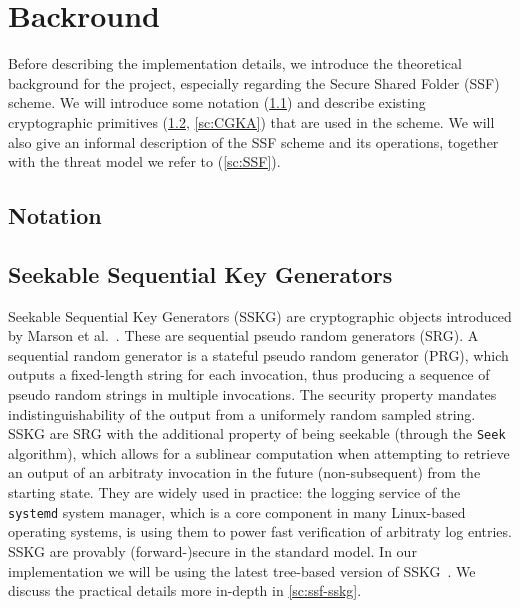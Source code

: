 \chapter{Backround}\label{ch:background}

Before describing the implementation details, we introduce the theoretical
background for the project, especially regarding the Secure Shared Folder 
(SSF) scheme. We will introduce some notation (\cref{sc:notation}) and
describe existing cryptographic primitives (\cref{sc:SSKG}, \cref{sc:CGKA})
that are used in the scheme.
We will also give an informal description of the SSF scheme and its operations,
together with the threat model we refer to (\cref{sc:SSF}).

\section{Notation}\label{sc:notation}


\section{Seekable Sequential Key Generators}\label{sc:SSKG}

Seekable Sequential Key Generators (SSKG) are cryptographic objects introduced by Marson et al.~\cite{ESORICS:MarPoe13}.
These are sequential pseudo random generators (SRG).
A sequential random generator is a stateful pseudo random generator (PRG), 
which outputs a fixed-length string for each invocation, 
thus producing a sequence of pseudo random strings in multiple invocations.
The security property mandates indistinguishability of the output from a uniformely random sampled string.
SSKG are SRG with the additional property of being seekable (through the \texttt{Seek} algorithm), 
which allows for a sublinear computation when attempting 
to retrieve an output of an arbitraty invocation in the future (non-subsequent)
from the starting state.
They are widely used in practice:
the logging service of the \texttt{systemd} system manager,
which is a core component in many Linux-based operating systems,
is using them to power fast verification of arbitraty log entries.
SSKG are provably (forward-)secure in the standard model.
In our implementation we will be using the latest tree-based version of SSKG~\cite{ESORICS:MarPoe14}.
We discuss the practical details more in-depth in \cref{sc:ssf-sskg}.

